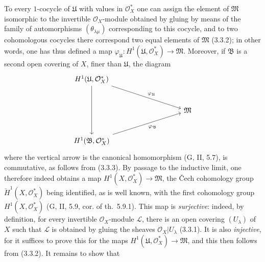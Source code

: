 \begin{env}[5.4.7]
To every $1$-cocycle of $\mathfrak{U}$ with values
in $\mathcal{O}_X^*$ one can assign the element of $\mathfrak{M}$ isomorphic to the
invertible $\mathcal{O}_X$-module obtained by gluing by means of the
family of automorphisms $(\theta_{\lambda\mu})$ corresponding to this cocycle,
and to two cohomologous cocycles there correspond two equal elements of
$\mathfrak{M}$ (3.3.2); in other words, one has thus defined a map
$\varphi_{\mathfrak{U}}:H^1(\mathfrak{U},\mathcal{O}_X^*)\to\mathfrak{M}$.
Moreover, if $\mathfrak{B}$ is a second open covering of $X$, finer
than $\mathfrak{U}$, the diagram
\[
\begin{tikzcd}[column sep=huge,row sep=large]
H^1(\mathfrak{U},\mathcal{O}_X^*)
  \arrow[dd]
  \arrow[rrd,"\varphi_{\mathfrak{U}}"] & & \\
& & \mathfrak{M} \\
H^1(\mathfrak{B},\mathcal{O}_X^*)
  \arrow[rru,swap,"\varphi_{\mathfrak{B}}"] & &
\end{tikzcd}
\]
where the vertical arrow is the canonical homomorphism (G, II, 5.7), is
commutative, as follows from (3.3.3). By passage to the inductive limit, one
therefore indeed obtains a map
$H^1(X,\mathcal{O}_X^*)\to\mathfrak{M}$, the \v{C}ech cohomology group
$\check{H}^1(X,\mathcal{O}_X^*)$ being identified, as is well known, with the first
cohomology group $H^1(X,\mathcal{O}_X^*)$ (G, II, 5.9, cor. of th.~5.9.1).
This map is \emph{surjective}: indeed, by definition, for every invertible
$\mathcal{O}_X$-module $\mathcal{L}$, there is an open covering
$(U_\lambda)$ of $X$ such that $\mathcal{L}$ is obtained by gluing the
sheaves $\mathcal{O}_X|U_\lambda$ (3.3.1). It is also
\emph{injective}, for it suffices to prove this for the maps
$H^1(\mathfrak{U},\mathcal{O}_X^*)\to\mathfrak{M}$, and this then follows from
(3.3.2). It remains to show that



\end{env}
